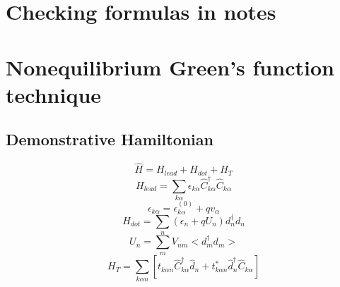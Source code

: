 \documentclass[11pt,a4paper]{book}
\begin{document}
\section{Checking formulas in notes}
% 
\section{Nonequilibrium Green's function technique}
\subsection{Demonstrative Hamiltonian}
\begin{equation}
\hat{H}=H_{l e a d}+H_{d o t}+H_{T}
\end{equation}
\begin{equation}
H_{l e a d}=\sum_{k \alpha} \epsilon_{k \alpha} \hat{C}_{k \alpha}^{\dagger} \hat{C}_{k \alpha}
\end{equation}
\begin{equation}
\epsilon_{k \alpha}=\epsilon_{k \alpha}^{(0)}+q v_{\alpha}
\end{equation}
\begin{equation}
H_{d o t}=\sum_{n}\left(\epsilon_{n}+q U_{n}\right) d_{n}^{\dagger} d_{n}
\end{equation}
\begin{equation}
U_{n}=\sum_{m} V_{n m}<d_{m}^{\dagger} d_{m}>
\end{equation}
\begin{equation}
H_{T}=\sum_{k \alpha n}\left[t_{k \alpha n} \hat{C}_{k \alpha}^{\dagger} \hat{d}_{n}+t_{k \alpha n}^{*} \hat{d}_{n}^{\dagger} \hat{C}_{k \alpha}\right]
\end{equation}
\end{document}
